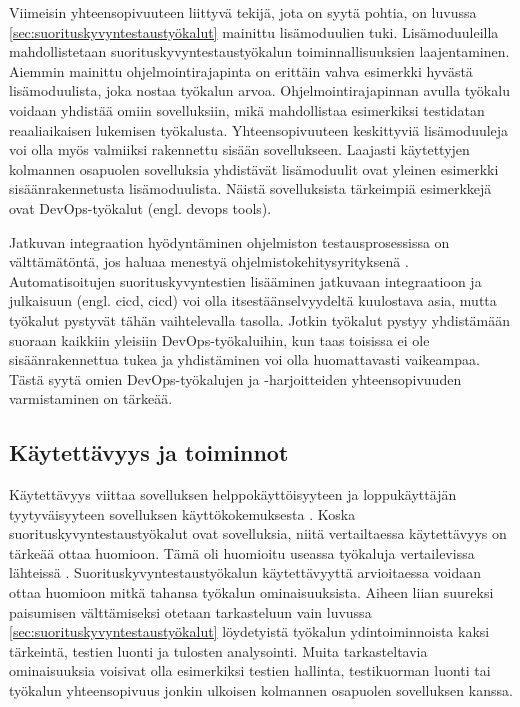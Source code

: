 Viimeisin yhteensopivuuteen liittyvä tekijä, jota on syytä pohtia, on luvussa \ref{sec:suorituskyvyntestaustyökalut} mainittu lisämoduulien tuki. Lisämoduuleilla mahdollistetaan suorituskyvyntestaustyökalun toiminnallisuuksien laajentaminen. Aiemmin mainittu ohjelmointirajapinta on erittäin vahva esimerkki hyvästä lisämoduulista, joka nostaa työkalun arvoa. Ohjelmointirajapinnan avulla työkalu voidaan yhdistää omiin sovelluksiin, mikä mahdollistaa esimerkiksi testidatan reaaliaikaisen lukemisen työkalusta. \parencite[143]{TheArtOfApplication} Yhteensopivuuteen keskittyviä lisämoduuleja voi olla myös valmiiksi rakennettu sisään sovellukseen. Laajasti käytettyjen kolmannen osapuolen sovelluksia yhdistävät lisämoduulit ovat yleinen esimerkki sisäänrakennetusta lisämoduulista. \parencite{NeoLoadThirdPartyTools} Näistä sovelluksista tärkeimpiä esimerkkejä ovat DevOps-työkalut (engl. \acrlong{devops} tools).

Jatkuvan integraation hyödyntäminen ohjelmiston testausprosessissa on välttämätöntä, jos haluaa menestyä ohjelmistokehitysyrityksenä \parencite[486]{AgileTestingAPracticalGuide}. Automatisoitujen suorituskyvyntestien lisääminen jatkuvaan integraatioon ja julkaisuun (engl. \acrlong{cicd}, \acrshort{cicd}) voi olla itsestäänselvyydeltä kuulostava asia, mutta työkalut pystyvät tähän vaihtelevalla tasolla. Jotkin työkalut pystyy yhdistämään suoraan kaikkiin yleisiin DevOps-työkaluihin, kun taas toisissa ei ole sisäänrakennettua tukea ja yhdistäminen voi olla huomattavasti vaikeampaa. \parencite{Top27PerformanceTestingTools} Tästä syytä omien DevOps-työkalujen ja -harjoitteiden yhteensopivuuden varmistaminen on tärkeää.


\subsection{Käytettävyys ja toiminnot}
\label{ssec:käytettävyys}
Käytettävyys viittaa sovelluksen helppokäyttöisyyteen ja loppukäyttäjän tyytyväisyyteen sovelluksen käyttökokemuksesta \parencite{ExtractingUsabilityInformation}. Koska suorituskyvyntestaustyökalut ovat sovelluksia, niitä vertailtaessa käytettävyys on tärkeää ottaa huomioon. Tämä oli huomioitu useassa työkaluja vertailevissa lähteissä \parencite{ScrutinizingAutomatedLoadTesting, ComparativeAnalysisOfWeb,SoftwarePerformanceTesting}. Suorituskyvyntestaustyökalun käytettävyyttä arvioitaessa voidaan ottaa huomioon mitkä tahansa työkalun ominaisuuksista. Aiheen liian suureksi paisumisen välttämiseksi otetaan tarkasteluun vain luvussa \ref{sec:suorituskyvyntestaustyökalut} löydetyistä työkalun ydintoiminnoista kaksi tärkeintä, testien luonti ja tulosten analysointi. Muita tarkasteltavia ominaisuuksia voisivat olla esimerkiksi testien hallinta, testikuorman luonti tai työkalun yhteensopivuus jonkin ulkoisen kolmannen osapuolen sovelluksen kanssa.

